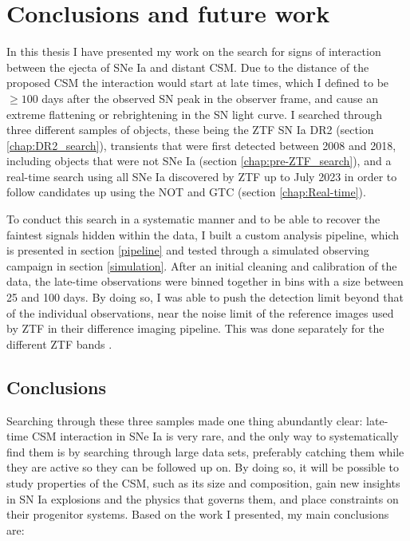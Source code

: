 \documentclass[a4paper,oneside,12pt, class=Latex/Classes/PhDthesisPSnPDF, crop=false]{standalone}
\begin{document}
\doublespacing
\chapter{Conclusions and future work}
\label{chap:Conc_and_fut}

In this thesis I have presented my work on the search for signs of interaction between the ejecta of SNe Ia and distant CSM. Due to the distance of the proposed CSM the interaction would start at late times, which I defined to be $\geq100$ days after the observed SN peak in the observer frame, and cause an extreme flattening or rebrightening in the SN light curve. I searched through three different samples of objects, these being the ZTF SN Ia DR2 (section \ref{chap:DR2_search}), transients that were first detected between 2008 and 2018, including objects that were not SNe Ia (section \ref{chap:pre-ZTF_search}), and a real-time search using all SNe Ia discovered by ZTF up to July 2023 in order to follow candidates up using the NOT and GTC (section \ref{chap:Real-time}).

To conduct this search in a systematic manner and to be able to recover the faintest signals hidden within the data, I built a custom analysis pipeline, which is presented in section \ref{pipeline} and tested through a simulated observing campaign in section \ref{simulation}. After an initial cleaning and calibration of the data, the late-time observations were binned together in bins with a size between 25 and 100 days. By doing so, I was able to push the detection limit beyond that of the individual observations, near the noise limit of the reference images used by ZTF in their difference imaging pipeline. This was done separately for the different ZTF bands \ztfg\ztfr\ztfi.


\section{Conclusions}
Searching through these three samples made one thing abundantly clear: late-time CSM interaction in SNe Ia is very rare, and the only way to systematically find them is by searching through large data sets, preferably catching them while they are active so they can be followed up on. By doing so, it will be possible to study properties of the CSM, such as its size and composition, gain new insights in SN Ia explosions and the physics that governs them, and place constraints on their progenitor systems. Based on the work I presented, my main conclusions are:
\end{document}
